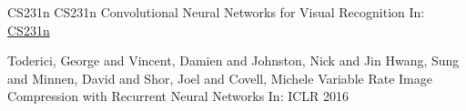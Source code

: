 \documentclass{beamer}
\begin{document}
\begin{frame}[allowframebreaks]
{\begin{thebibliography}{99}
 CS231n
\newblock CS231n Convolutional Neural Networks for Visual Recognition
\newblock In: \href{http://cs231n.github.io/convolutional-networks}{CS231n}

 Toderici, George and Vincent, Damien and Johnston, Nick and Jin Hwang, Sung and Minnen, David and Shor, Joel and Covell, Michele
\newblock Variable Rate Image Compression with Recurrent Neural Networks
\newblock In: ICLR 2016


\end{thebibliography}
}
\end{frame}
\end{document}
